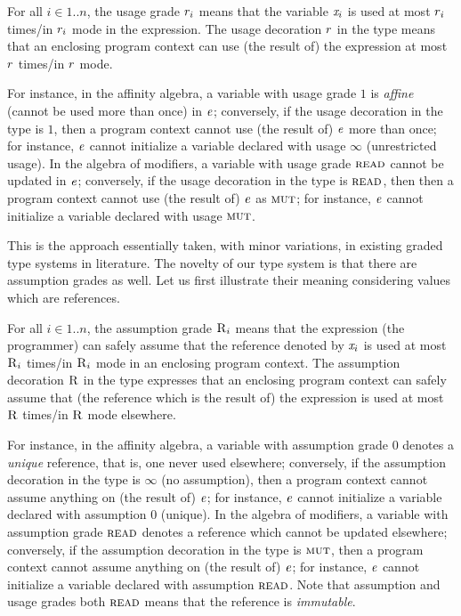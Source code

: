 For all $i\in 1..n$, the usage grade $r_i$ means that the variable $\mathit{x}_i$ is used at most $r_i$ times/in $r_i$ mode in the expression. The usage decoration $r$ in the type means that an enclosing program context can use (the result of) the expression at most $r$ times/in $r$ mode. 

For instance, in the affinity algebra, a variable with usage grade $1$ is \emph{affine} (cannot be used more than once) in $\mathit{e}$; conversely, if the usage decoration in the type is $1$, 
then a program context cannot use (the result of) $\mathit{e}$ more than once; for instance, $\mathit{e}$ cannot initialize a variable declared with usage $\infty$ (unrestricted usage). 
In the algebra of modifiers, a variable with usage grade $\textsc{read}$ cannot be updated in $\mathit{e}$; conversely, if the usage decoration in the type is $\textsc{read}$, then then a program context cannot use (the result of) $\mathit{e}$ as $\textsc{mut}$; for instance, $\mathit{e}$ cannot initialize a variable declared with usage $\textsc{mut}$. 

This is the approach essentially taken, with minor variations, in existing graded type systems in literature.
The novelty of our type system is that there are assumption grades  as well. Let us first illustrate their meaning considering values which are references.

For all $i\in 1..n$, the assumption grade $\textsc{R}_i$ means that the expression (the programmer) can safely assume that the reference denoted by $\mathit{x}_i$ is used at most $\textsc{R}_i$ times/in $\textsc{R}_i$ mode  in an enclosing program context.
The assumption decoration $\textsc{R}$ in the type expresses that an enclosing program context can safely assume that (the reference which is the result of) the expression  is used at most $\textsc{R}$ times/in $\textsc{R}$ mode elsewhere. 

For instance, in the affinity algebra, a variable with assumption grade $0$ denotes a \emph{unique} reference, that is, one never used elsewhere; conversely, if the assumption decoration in the type is $\infty$ (no assumption), then a program context cannot assume 
anything on (the result of) $\mathit{e}$; for instance, $\mathit{e}$ cannot initialize a variable declared with assumption $0$ (unique). In the algebra of modifiers, a variable with assumption grade $\textsc{read}$ denotes a reference which cannot be updated elsewhere; conversely, if the assumption decoration in the type is $\textsc{mut}$, then a program context cannot assume 
anything on (the result of) $\mathit{e}$; for instance, $\mathit{e}$ cannot initialize a variable declared with assumption $\textsc{read}$. Note that assumption and usage grades both $\textsc{read}$ means that the reference is \emph{immutable}. 

